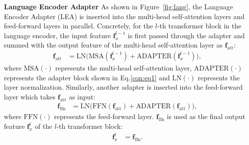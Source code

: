 \documentclass[10pt,twocolumn,letterpaper]{article}
\def\vf{{\bm{f}}}
\begin{document}
\noindent\textbf{Language Encoder Adapter}
As shown in Figure~\ref{fig:lang}, the Language Encoder Adapter (LEA) is inserted into the multi-head self-attention layers and feed-forward layers in parallel. 
Concretely, for the $l$-th transformer block in the language encoder, the input feature $\vf^{l-1}_x$ is first passed through the adapter 
and summed with the output feature of the multi-head self-attention layer as $\vf_{\text{att}}$:
\begin{align}
    \vf_{\text{att}} &= \text{LN}\big(\text{MSA}(\vf^{l-1}_x) + \text{ADAPTER}(\vf^{l-1}_x)\big),
\end{align}
where $\text{MSA}(\cdot)$ represents the multi-head self-attention layer, $\text{ADAPTER}(\cdot)$ represents the adapter block shown in Eq.\ref{con:eq1} and $\text{LN}(\cdot)$ represents the layer normalization. 
Similarly, another adapter is inserted into the feed-forward layer which takes $\vf_{\text{att}}$ as input:
\begin{align}
    \vf_{\text{ffn}} &= \text{LN}\big(\text{FFN}(\vf_{\text{att}}) + \text{ADAPTER}(\vf_{\text{att}})\big),
\end{align}
where $\text{FFN}(\cdot)$ represents the feed-forward layer. $\vf_{\text{ffn}}$ is used as the final output feature $\vf^{l}_x$ of the $l$-th transformer block:
\begin{align}
\vf^{l}_x &= \vf_{\text{ffn}}.
\end{align}
\end{document}
